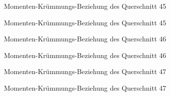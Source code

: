 \documentclass[
  11pt,
  letterpaper,
]{scrreprt}
\begin{document}
\begin{figure}[H]


\caption{\label{fig-qs_45}Momenten-Krümmungs-Beziehung des Querschnitt
45}

\end{figure}%

\begin{figure}[H]


\caption{\label{fig-m_chi_45}Momenten-Krümmungs-Beziehung des
Querschnitt 45}

\end{figure}%

\begin{figure}[H]


\caption{\label{fig-qs_46}Momenten-Krümmungs-Beziehung des Querschnitt
46}

\end{figure}%

\begin{figure}[H]


\caption{\label{fig-m_chi_46}Momenten-Krümmungs-Beziehung des
Querschnitt 46}

\end{figure}%

\begin{figure}[H]


\caption{\label{fig-qs_47}Momenten-Krümmungs-Beziehung des Querschnitt
47}

\end{figure}%

\begin{figure}[H]


\caption{\label{fig-m_chi_47}Momenten-Krümmungs-Beziehung des
Querschnitt 47}

\end{figure}%
\end{document}
